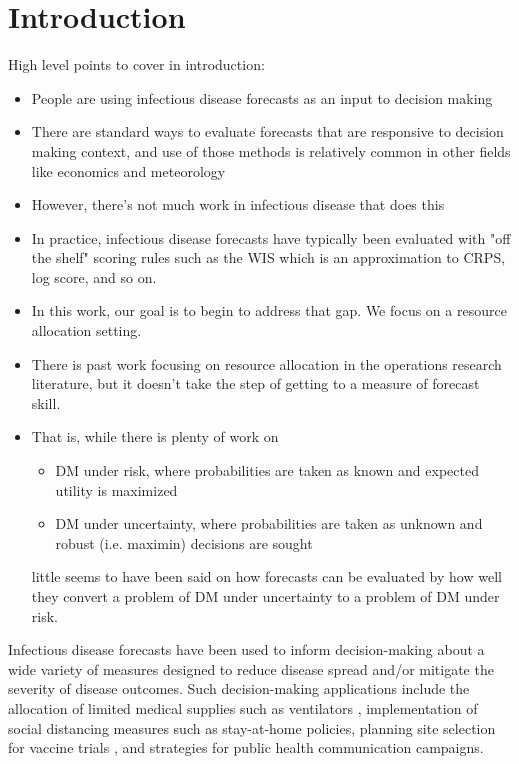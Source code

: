 \documentclass{article}
\begin{document}
\section{Introduction}

High level points to cover in introduction:
\begin{itemize}
\item People are using infectious disease forecasts as an input to decision making
\item There are standard ways to evaluate forecasts that are responsive to decision making context, and use of those methods is relatively common in other fields like economics and meteorology
\item However, there's not much work in infectious disease that does this
\item In practice, infectious disease forecasts have typically been evaluated with "off the shelf" scoring rules such as the WIS which is an approximation to CRPS, log score, and so on.
\item In this work, our goal is to begin to address that gap. We focus on a resource allocation setting.
\item There is past work focusing on resource allocation in the operations research literature, but it doesn't take the step of getting to a measure of forecast skill.
\item That is, while there is plenty of work on 
\begin{itemize}
\item DM under risk, where probabilities are taken as known and expected utility is maximized
\item DM under uncertainty, where probabilities are taken as unknown and robust (i.e. maximin) decisions are sought
\end{itemize}
little seems to have been said on how forecasts can be evaluated by how well they convert a problem of DM under uncertainty to a problem of DM under risk.
\end{itemize}

Infectious disease forecasts have been used to inform decision-making about a wide variety of measures designed to reduce disease spread and/or mitigate the severity of disease outcomes. Such decision-making applications include the allocation of limited medical supplies such as ventilators \cite{bertsimas2021predictionsCOVID}, implementation of social distancing measures such as stay-at-home policies, planning site selection for vaccine trials \cite{bertsimas2021predictionsCOVID}, and strategies for public health communication campaigns.
\end{document}
